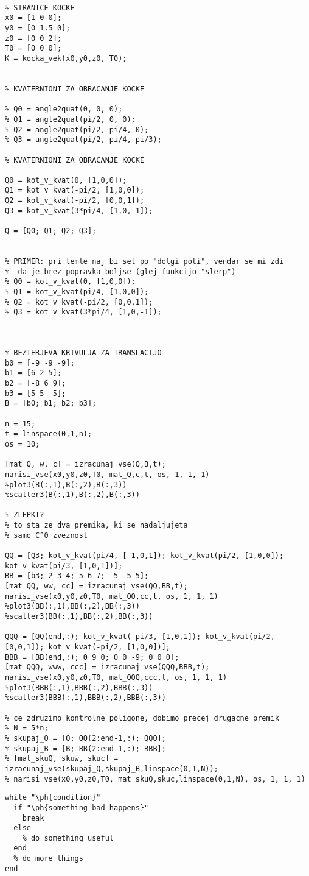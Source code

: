 \documentclass[12pt,a4paper,twoside]{article}
\let\ph\mlplaceholder %
\theoremstyle{definition} %
\theoremstyle{plain} %
\numberwithin{equation}{section}  %
\begin{document}
\begin{lstlisting}[caption = {}]
% definicija kocke

% STRANICE KOCKE
x0 = [1 0 0];
y0 = [0 1.5 0];
z0 = [0 0 2];
T0 = [0 0 0];
K = kocka_vek(x0,y0,z0, T0);


% KVATERNIONI ZA OBRACANJE KOCKE

% Q0 = angle2quat(0, 0, 0);
% Q1 = angle2quat(pi/2, 0, 0);
% Q2 = angle2quat(pi/2, pi/4, 0);
% Q3 = angle2quat(pi/2, pi/4, pi/3);

% KVATERNIONI ZA OBRACANJE KOCKE

Q0 = kot_v_kvat(0, [1,0,0]);
Q1 = kot_v_kvat(-pi/2, [1,0,0]);
Q2 = kot_v_kvat(-pi/2, [0,0,1]);
Q3 = kot_v_kvat(3*pi/4, [1,0,-1]);

Q = [Q0; Q1; Q2; Q3];


% PRIMER: pri temle naj bi sel po "dolgi poti", vendar se mi zdi
%  da je brez popravka boljse (glej funkcijo "slerp")
% Q0 = kot_v_kvat(0, [1,0,0]);
% Q1 = kot_v_kvat(pi/4, [1,0,0]);
% Q2 = kot_v_kvat(-pi/2, [0,0,1]);
% Q3 = kot_v_kvat(3*pi/4, [1,0,-1]);



% BEZIERJEVA KRIVULJA ZA TRANSLACIJO
b0 = [-9 -9 -9];
b1 = [6 2 5];
b2 = [-8 6 9];
b3 = [5 5 -5];
B = [b0; b1; b2; b3];

n = 15;
t = linspace(0,1,n);
os = 10;

[mat_Q, w, c] = izracunaj_vse(Q,B,t);
narisi_vse(x0,y0,z0,T0, mat_Q,c,t, os, 1, 1, 1)
%plot3(B(:,1),B(:,2),B(:,3))
%scatter3(B(:,1),B(:,2),B(:,3))

% ZLEPKI?
% to sta ze dva premika, ki se nadaljujeta 
% samo C^0 zveznost

QQ = [Q3; kot_v_kvat(pi/4, [-1,0,1]); kot_v_kvat(pi/2, [1,0,0]); kot_v_kvat(pi/3, [1,0,1])]; 
BB = [b3; 2 3 4; 5 6 7; -5 -5 5];
[mat_QQ, ww, cc] = izracunaj_vse(QQ,BB,t);
narisi_vse(x0,y0,z0,T0, mat_QQ,cc,t, os, 1, 1, 1)
%plot3(BB(:,1),BB(:,2),BB(:,3))
%scatter3(BB(:,1),BB(:,2),BB(:,3))

QQQ = [QQ(end,:); kot_v_kvat(-pi/3, [1,0,1]); kot_v_kvat(pi/2, [0,0,1]); kot_v_kvat(-pi/2, [1,0,0])]; 
BBB = [BB(end,:); 0 9 0; 0 0 -9; 0 0 0];
[mat_QQQ, www, ccc] = izracunaj_vse(QQQ,BBB,t);
narisi_vse(x0,y0,z0,T0, mat_QQQ,ccc,t, os, 1, 1, 1)
%plot3(BBB(:,1),BBB(:,2),BBB(:,3))
%scatter3(BBB(:,1),BBB(:,2),BBB(:,3))

% ce zdruzimo kontrolne poligone, dobimo precej drugacne premik
% N = 5*n;
% skupaj_Q = [Q; QQ(2:end-1,:); QQQ];
% skupaj_B = [B; BB(2:end-1,:); BBB];
% [mat_skuQ, skuw, skuc] = izracunaj_vse(skupaj_Q,skupaj_B,linspace(0,1,N));
% narisi_vse(x0,y0,z0,T0, mat_skuQ,skuc,linspace(0,1,N), os, 1, 1, 1)
\end{lstlisting}


\begin{lstlisting}[caption = {For educational purposes}]
% example of while loop using placeholders
while "\ph{condition}"
  if "\ph{something-bad-happens}"
    break
  else
    % do something useful
  end
  % do more things
end
\end{lstlisting}
\end{document}
